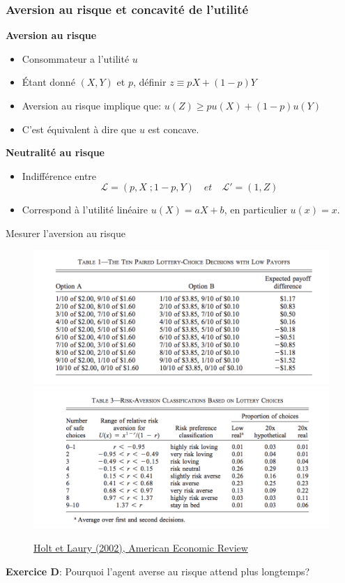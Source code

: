 \documentclass[handout]{beamer}
\newenvironment{iPar}[1]{\textbf{#1} \begin{itemize}}{\end{itemize}}
\newcommand{\mdp}{\medskip \pause}
\begin{document}
\begin{frame}\frametitle{Aversion au risque et concavité de l'utilité}

\begin{iPar}{Aversion au risque} \item Consommateur a l'utilité $u$ \item Étant donné
$(X,Y)$ et $p$, définir  $z \equiv pX + (1-p)Y $ \item Aversion au risque implique que: $ u(Z) \geq pu(X) + (1-p)u(Y)$ \item C'est équivalent à dire que $u$ est concave. \end{iPar}\mdp

\begin{iPar}{Neutralité au risque}
\item Indifférence entre $$ \mathcal L = (p, X\;; 1-p,Y) \quad et \quad  \mathcal L' = (1,Z)$$
\item Correspond à l'utilité linéaire $u(X) = a X + b$, en particulier $u(x) = x$.
\end{iPar}

\end{frame}

\begin{frame}{Mesurer l'aversion au risque}


\begin{figure}
\centering
\includegraphics[scale=0.4]{lotteries.png} 
\includegraphics[scale=0.4]{choices.png}
\caption{\href{https://pubs.aeaweb.org/doi/pdfplus/10.1257/000282802762024700}{Holt et Laury (2002), American Economic Review}}
\end{figure}

\textbf{Exercice D}: Pourquoi l'agent averse au risque attend plus longtemps?
\end{frame}
\end{document}
